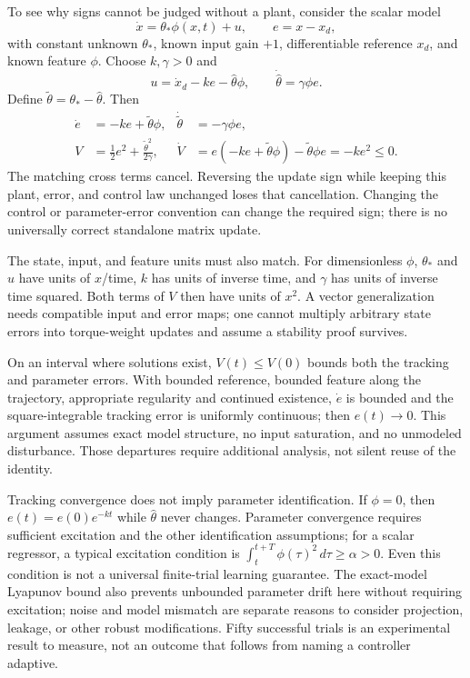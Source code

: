 To see why signs cannot be judged without a plant, consider the scalar model
\begin{equation}
 \dot x=\theta_*\phi(x,t)+u,\qquad e=x-x_d,
 \label{eq:ch11:adaptive-plant}
\end{equation}
with constant unknown $\theta_*$, known input gain $+1$, differentiable reference
$x_d$, and known feature $\phi$. Choose $k,\gamma>0$ and
\begin{equation}
 u=\dot x_d-ke-\hat\theta\phi,
 \qquad \dot{\hat\theta}=\gamma\phi e.
 \label{eq:ch11:cerebellar-control}
\end{equation}
Define $\tilde\theta=\theta_*-\hat\theta$. Then
\begin{align}
 \dot e&=-ke+\tilde\theta\phi, &
 \dot{\tilde\theta}&=-\gamma\phi e,\\
 V&=\tfrac12 e^2+\frac{\tilde\theta^2}{2\gamma}, &
 \dot V&=e(-ke+\tilde\theta\phi)
       -\tilde\theta\phi e=-ke^2\le0.
 \label{eq:ch11:adaptive-energy}
\end{align}
The matching cross terms cancel. Reversing the update sign while keeping this
plant, error, and control law unchanged loses that cancellation. Changing the
control or parameter-error convention can change the required sign; there is
no universally correct standalone matrix update.

The state, input, and feature units must also match. For dimensionless $\phi$,
$\theta_*$ and $u$ have units of $x$/time, $k$ has units of inverse time, and
$\gamma$ has units of inverse time squared. Both terms of $V$ then have units
of $x^2$. A vector generalization needs compatible input and error maps; one
cannot multiply arbitrary state errors into torque-weight updates and assume
a stability proof survives.

On an interval where solutions exist, $V(t)\le V(0)$ bounds both the tracking
and parameter errors. With bounded reference, bounded feature along the
trajectory, appropriate regularity and continued existence, $\dot e$ is
bounded and the square-integrable tracking error is uniformly continuous;
then $e(t)\to0$. This argument assumes exact model structure, no input
saturation, and no unmodeled disturbance. Those departures require additional
analysis, not silent reuse of the identity.

Tracking convergence does not imply parameter identification. If $\phi=0$,
then $e(t)=e(0)e^{-kt}$ while $\hat\theta$ never changes. Parameter convergence
requires sufficient excitation and the other identification assumptions; for
a scalar regressor, a typical excitation condition is
$\int_t^{t+T}\phi(\tau)^2\,d\tau\ge\alpha>0$. Even this condition is not a
universal finite-trial learning guarantee. The exact-model Lyapunov bound also
prevents unbounded parameter drift here without requiring excitation; noise
and model mismatch are separate reasons to consider projection, leakage, or
other robust modifications. Fifty successful trials is an experimental result
to measure, not an outcome that follows from naming a controller adaptive.

